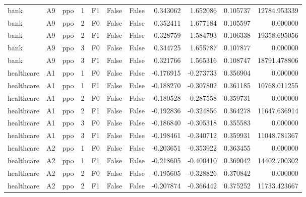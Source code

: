 \begin{tabular}{lllrlllrrrr}
      bank &      A9 &       ppo &     1 &  F1 &           False &            False &  0.343062 &  1.652086 & 0.105737 &     12784.953339 \\
      bank &      A9 &       ppo &     2 &  F0 &           False &            False &  0.352411 &  1.677184 & 0.105597 &         0.000000 \\
      bank &      A9 &       ppo &     2 &  F1 &           False &            False &  0.328759 &  1.584793 & 0.106338 &     19358.695056 \\
      bank &      A9 &       ppo &     3 &  F0 &           False &            False &  0.344725 &  1.655787 & 0.107877 &         0.000000 \\
      bank &      A9 &       ppo &     3 &  F1 &           False &            False &  0.321766 &  1.565316 & 0.108747 &     18791.478806 \\
healthcare &      A1 &       ppo &     1 &  F0 &           False &            False & -0.176915 & -0.273733 & 0.356904 &         0.000000 \\
healthcare &      A1 &       ppo &     1 &  F1 &           False &            False & -0.188270 & -0.307802 & 0.361185 &     10768.011255 \\
healthcare &      A1 &       ppo &     2 &  F0 &           False &            False & -0.180528 & -0.287558 & 0.359731 &         0.000000 \\
healthcare &      A1 &       ppo &     2 &  F1 &           False &            False & -0.192836 & -0.324856 & 0.364278 &     11647.636914 \\
healthcare &      A1 &       ppo &     3 &  F0 &           False &            False & -0.186840 & -0.305318 & 0.355583 &         0.000000 \\
healthcare &      A1 &       ppo &     3 &  F1 &           False &            False & -0.198461 & -0.340712 & 0.359931 &     11048.781367 \\
healthcare &      A2 &       ppo &     1 &  F0 &           False &            False & -0.203651 & -0.353922 & 0.363455 &         0.000000 \\
healthcare &      A2 &       ppo &     1 &  F1 &           False &            False & -0.218605 & -0.400410 & 0.369042 &     14402.700302 \\
healthcare &      A2 &       ppo &     2 &  F0 &           False &            False & -0.195605 & -0.328826 & 0.370842 &         0.000000 \\
healthcare &      A2 &       ppo &     2 &  F1 &           False &            False & -0.207874 & -0.366442 & 0.375252 &     11733.423667 \\

\end{tabular}
